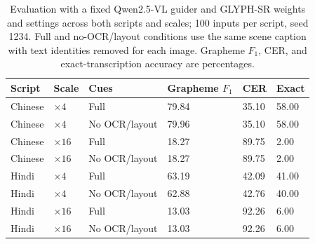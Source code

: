 \begin{table}[H]
\centering
\caption{Evaluation with a fixed Qwen2.5-VL guider and GLYPH-SR weights and settings across both scripts and scales; 100 inputs per script, seed 1234. Full and no-OCR/layout conditions use the same scene caption with text identities removed for each image. Grapheme $F_1$, CER, and exact-transcription accuracy are percentages.}
\label{tab:ar-common-nonlatin}
\small
\setlength{\tabcolsep}{4pt}
\begin{tabular}{llllll}
\toprule
Script & Scale & Cues & Grapheme $F_1$ & CER & Exact \\
\midrule
Chinese & $\times4$ & Full & 79.84 & 35.10 & 58.00 \\
Chinese & $\times4$ & No OCR/layout & 79.96 & 35.10 & 58.00 \\
Chinese & $\times16$ & Full & 18.27 & 89.75 & 2.00 \\
Chinese & $\times16$ & No OCR/layout & 18.27 & 89.75 & 2.00 \\
Hindi & $\times4$ & Full & 63.19 & 42.09 & 41.00 \\
Hindi & $\times4$ & No OCR/layout & 62.88 & 42.76 & 40.00 \\
Hindi & $\times16$ & Full & 13.03 & 92.26 & 6.00 \\
Hindi & $\times16$ & No OCR/layout & 13.03 & 92.26 & 6.00 \\
\bottomrule
\end{tabular}
\end{table}
